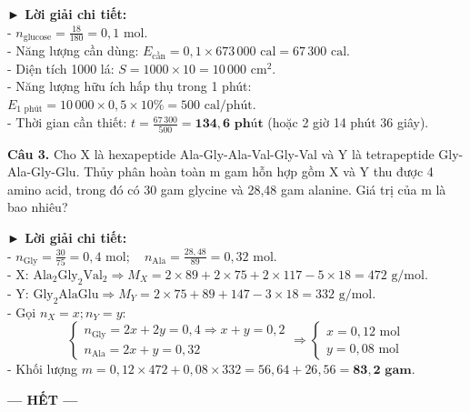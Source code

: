 \documentclass[11pt,a4paper]{article}
\begin{document}
\begin{tcolorbox}[colback=white,colframe=solBlue,arc=1mm,boxrule=0.5pt,top=2mm,bottom=2mm,left=3mm,right=3mm]
{\color{solBlue}\textbf{► Lời giải chi tiết:}}\\
- $n_{\text{glucose}} = \frac{18}{180} = 0{,}1\text{ mol}$.\\
- Năng lượng cần dùng: $E_{\text{cần}} = 0{,}1 \times 673\,000\text{ cal} = 67\,300\text{ cal}$.\\
- Diện tích 1000 lá: $S = 1000 \times 10 = 10\,000\text{ cm}^2$.\\
- Năng lượng hữu ích hấp thụ trong 1 phút: $E_{\text{1 phút}} = 10\,000 \times 0{,}5 \times 10\% = 500\text{ cal/phút}$.\\
- Thời gian cần thiết: $t = \frac{67\,300}{500} = \mathbf{134{,}6\text{ phút}}$ (hoặc 2 giờ 14 phút 36 giây).
\end{tcolorbox}

\vspace{6pt}
\noindent\textbf{Câu 3.} Cho X là hexapeptide Ala-Gly-Ala-Val-Gly-Val và Y là tetrapeptide Gly-Ala-Gly-Glu. Thủy phân hoàn toàn m gam hỗn hợp gồm X và Y thu được 4 amino acid, trong đó có 30 gam glycine và 28,48 gam alanine. Giá trị của m là bao nhiêu?

\begin{tcolorbox}[colback=white,colframe=solBlue,arc=1mm,boxrule=0.5pt,top=2mm,bottom=2mm,left=3mm,right=3mm]
{\color{solBlue}\textbf{► Lời giải chi tiết:}}\\
- $n_{\text{Gly}} = \frac{30}{75} = 0{,}4\text{ mol}; \quad n_{\text{Ala}} = \frac{28{,}48}{89} = 0{,}32\text{ mol}$.\\
- X: $\text{Ala}_2\text{Gly}_2\text{Val}_2 \Rightarrow M_X = 2 \times 89 + 2 \times 75 + 2 \times 117 - 5 \times 18 = 472\text{ g/mol}$.\\
- Y: $\text{Gly}_2\text{AlaGlu} \Rightarrow M_Y = 2 \times 75 + 89 + 147 - 3 \times 18 = 332\text{ g/mol}$.\\
- Gọi $n_X = x; n_Y = y$:
  $$\begin{cases} n_{\text{Gly}} = 2x + 2y = 0{,}4 \Rightarrow x + y = 0{,}2 \\ n_{\text{Ala}} = 2x + y = 0{,}32 \end{cases} \Rightarrow \begin{cases} x = 0{,}12\text{ mol} \\ y = 0{,}08\text{ mol} \end{cases}$$
- Khối lượng $m = 0{,}12 \times 472 + 0{,}08 \times 332 = 56{,}64 + 26{,}56 = \mathbf{83{,}2\text{ gam}}$.
\end{tcolorbox}

\begin{center}
\textbf{--- HẾT ---}
\end{center}
\end{document}
